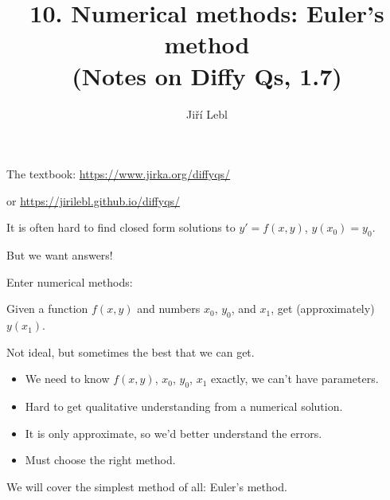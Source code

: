 \documentclass[10pt,aspectratio=169]{beamer}
\author{Ji\v{r}\'i Lebl}
\institute[OSU]{%
Oklahoma State University%
}
\title{10. Numerical methods: Euler's method\\(Notes on Diffy Qs, 1.7)}
\date{}
\begin{document}
\begin{frame}
\titlepage


\begin{center}
The textbook: \url{https://www.jirka.org/diffyqs/}

or \url{https://jirilebl.github.io/diffyqs/}
\end{center}
\end{frame}

\begin{frame}
It is often hard to find closed form solutions to
\quad
$y' = f(x,y)$, \quad $y(x_0) = y_0$.

\medskip
\pause

But we want answers!

\pause
Enter numerical methods:

Given a function $f(x,y)$ and numbers $x_0$, $y_0$, and $x_1$, get (approximately) $y(x_1)$.

\medskip
\pause

Not ideal, but sometimes the best that we can get.

\begin{itemize}
\item \pause
We need to know $f(x,y)$, $x_0$, $y_0$, $x_1$ exactly, we can't have parameters.
\item \pause
Hard to get qualitative understanding from a numerical solution.
\item \pause
It is only approximate, so we'd better understand the errors.
\item \pause
Must choose the right method.
\end{itemize}

\pause
\medskip

We will cover the simplest method of all: Euler's method.

\end{frame}
\end{document}
